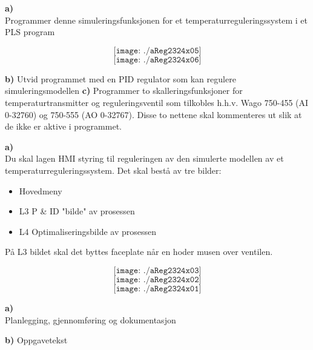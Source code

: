 \vfil \eject
\oppgave{}%
\textbf{a)}\\
Programmer denne simuleringsfunksjonen for et temperaturreguleringssystem i et PLS program
\vskip 1cm 

$$\texttt{[image: ./aReg2324x05]}$$
$$\texttt{[image: ./aReg2324x06]}$$

\textbf{b)}
Utvid programmet med en PID regulator som kan regulere simuleringsmodellen
\vskip 1cm 
\textbf{c)}
Programmer to skalleringsfunksjoner for temperaturtransmitter og reguleringsventil som tilkobles h.h.v. Wago 750-455 (AI 0-32760) og 750-555 (AO 0-32767). Disse to nettene skal kommenteres ut slik at de ikke er aktive i programmet. 
\vskip 1cm 

\vfil \eject
\oppgave{}%
\textbf{a)}\\
\vskip 1cm 
Du skal lagen HMI styring til reguleringen av den simulerte modellen av et temperaturreguleringssystem. Det skal bestå av tre bilder:
\begin{itemize}
	\item Hovedmeny
	\item L3 P \& ID "bilde" av prosessen
	\item L4 Optimaliseringsbilde av prosessen
\end{itemize}

På L3 bildet skal det byttes faceplate når en hoder musen over ventilen. 


$$\texttt{[image: ./aReg2324x03]}$$
$$\texttt{[image: ./aReg2324x02]}$$
$$\texttt{[image: ./aReg2324x01]}$$

\vfil \eject
\oppgave{}%
\textbf{a)}\\
Planlegging, gjennomføring og dokumentasjon
\vskip 1cm 


\textbf{b)}
Oppgavetekst
\vskip 1cm 

\vfil \eject



